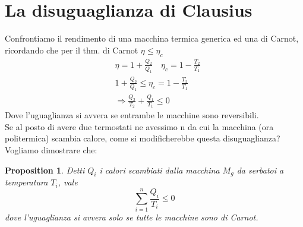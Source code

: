 \documentclass[10pt,a4paper]{article}
\newtheorem{prop}{Proposition}
\begin{document}
\section{La disuguaglianza di Clausius}
Confrontiamo il rendimento di una macchina termica generica ed una di Carnot, ricordando che per il thm. di Carnot \(\eta \leq \eta_c\)
\begin{align*}
	&\eta = 1 + \frac{Q_2}{Q_1} \quad \eta_c = 1 - \frac{T_2}{T_1}\\
	&1 + \frac{Q_2}{Q_1} \leq \eta_c = 1 - \frac{T_2}{T_1}\\
	&\Rightarrow \frac{Q_2}{T_2}+\frac{Q_1}{T_1}\leq 0
\end{align*}
Dove l'uguaglianza si avvera se entrambe le macchine sono reversibili.\\
Se al posto di avere due termostati ne avessimo n da cui la macchina (ora politermica) scambia calore, come si modificherebbe questa disuguaglianza? Vogliamo dimostrare che:
\begin{prop}
Detti \(Q_i\) i calori scambiati dalla macchina \(M_g\) da serbatoi a temperatura \(T_i\), vale
\[\sum_{i=1}^{n}\frac{Q_i}{T_i}\leq 0\]
dove l'uguaglianza si avvera solo se tutte le macchine sono di Carnot.
\end{prop}
\end{document}
